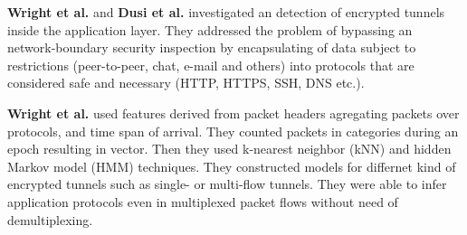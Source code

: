\textbf{Wright et al.} \cite{wright2006inferring} and \textbf{Dusi et al.} \cite{dusi2009tunnel} 
investigated an detection of encrypted tunnels inside the application layer. 
They addressed the problem of bypassing an network-boundary
security inspection by encapsulating of data subject to restrictions 
(peer-to-peer, chat, e-mail and others) into protocols that are considered safe 
and necessary (HTTP, HTTPS, SSH, DNS etc.). 

\textbf{Wright et al.} \cite{wright2006inferring} used features derived from packet headers agregating packets over
protocols, and time span of arrival. They counted packets in categories during an epoch
resulting in vector. Then they used k-nearest neighbor (kNN) and hidden Markov model 
(HMM) techniques. They constructed models for differnet kind of encrypted tunnels 
such as single- or multi-flow tunnels. They were able to infer application protocols even in
multiplexed packet flows without need of demultiplexing.



